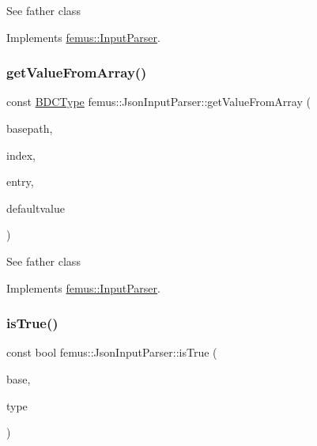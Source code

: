 See father class 

Implements \mbox{\hyperlink{classfemus_1_1_input_parser_a08f0f52e28b4e9dfc5dcf7c1ba267938}{femus\+::\+Input\+Parser}}.

\mbox{\label{classfemus_1_1_json_input_parser_a02383042c4eaebfd7e0743abcb91d771}} 
\subsubsection{\texorpdfstring{get\+Value\+From\+Array()}{getValueFromArray()}\hspace{0.1cm}{\footnotesize\ttfamily [2/2]}}
{\footnotesize\ttfamily const \mbox{\hyperlink{_b_d_c_type_enum_8hpp_ac1efcf28f6f152fe5354b888f616668d}{B\+D\+C\+Type}} femus\+::\+Json\+Input\+Parser\+::get\+Value\+From\+Array (\begin{DoxyParamCaption}\item[{const std\+::string \&}]{basepath,  }\item[{const unsigned int}]{index,  }\item[{const std\+::string}]{entry,  }\item[{const \mbox{\hyperlink{_b_d_c_type_enum_8hpp_ac1efcf28f6f152fe5354b888f616668d}{B\+D\+C\+Type}}}]{defaultvalue }\end{DoxyParamCaption})\hspace{0.3cm}{\ttfamily [virtual]}}

See father class 

Implements \mbox{\hyperlink{classfemus_1_1_input_parser_a30b8407afe22e7ff56b67766cef51929}{femus\+::\+Input\+Parser}}.

\mbox{\label{classfemus_1_1_json_input_parser_af6e86057aa2b4bc01fad78ff7340fbc6}} 
\subsubsection{\texorpdfstring{is\+True()}{isTrue()}}
{\footnotesize\ttfamily const bool femus\+::\+Json\+Input\+Parser\+::is\+True (\begin{DoxyParamCaption}\item[{const std\+::string \&}]{base,  }\item[{const std\+::string \&}]{type }\end{DoxyParamCaption})\hspace{0.3cm}{\ttfamily [virtual]}}

